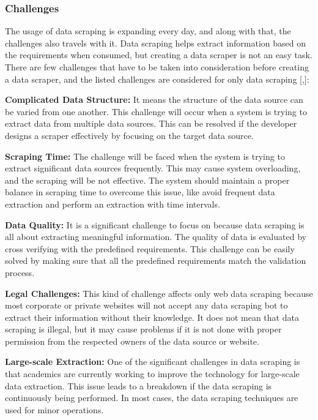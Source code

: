 \subsubsection{Challenges}
%
%
The usage of data scraping is expanding every day, and along with that, the challenges also travels with it. Data scraping helps extract information based on the requirements when consumed, but creating a data scraper is not an easy task. There are few challenges that have to be taken into consideration before creating a data scraper, and the listed challenges are considered for only data scraping [\cite{And2021},\cite{Mic2020}]:

{\bf Complicated Data Structure:} It means the structure of the data source can be varied from one another. This challenge will occur when a system is trying to extract data from multiple data sources. This can be resolved if the developer designs a scraper effectively by focusing on the target data source.

{\bf Scraping Time:} The challenge will be faced when the system is trying to extract significant data sources frequently. This may cause system overloading, and the scraping will be not effective. The system should maintain a proper balance in scraping time to overcome this issue, like avoid frequent data extraction and perform an extraction with time intervals.

{\bf Data Quality:} It is a significant challenge to focus on because data scraping is all about extracting meaningful information. The quality of data is evaluated by cross verifying with the predefined requirements. This challenge can be easily solved by making sure that all the predefined requirements match the validation process.

{\bf Legal Challenges:} This kind of challenge affects only web data scraping because most corporate or private websites will not accept any data scraping bot to extract their information without their knowledge. It does not mean that data scraping is illegal, but it may cause problems if it is not done with proper permission from the respected owners of the data source or website.

{\bf Large-scale Extraction:} One of the significant challenges in data scraping is that academics are currently working to improve the technology for large-scale data extraction. This issue leads to a breakdown if the data scraping is continuously being performed. In most cases, the data scraping techniques are used for minor operations.
 
